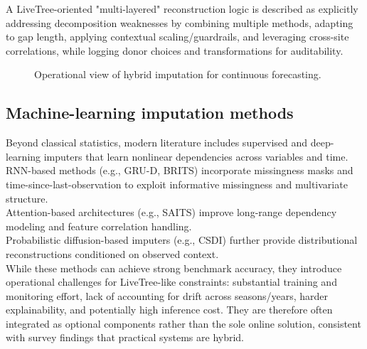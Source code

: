 A LiveTree-oriented "multi-layered" reconstruction logic is described as explicitly addressing decomposition weaknesses by combining multiple methods, adapting to gap length, applying contextual scaling/guardrails, and leveraging cross-site correlations, while logging donor choices and transformations for auditability.%
%

\begin{figure}[h]
\centering
{}
\caption{Operational view of hybrid imputation for continuous forecasting.}
\end{figure}

\subsection{Machine-learning imputation methods}
Beyond classical statistics, modern literature includes supervised and deep-learning imputers that learn nonlinear dependencies across variables and time. RNN-based methods (e.g., GRU-D, BRITS) incorporate missingness masks and time-since-last-observation to exploit informative missingness and multivariate structure.\\%
Attention-based architectures (e.g., SAITS) improve long-range dependency modeling and feature correlation handling.\\%
Probabilistic diffusion-based imputers (e.g., CSDI) further provide distributional reconstructions conditioned on observed context.\\%

While these methods can achieve strong benchmark accuracy, they introduce operational challenges for LiveTree-like constraints: substantial training and monitoring effort, lack of accounting for drift across seasons/years, harder explainability, and potentially high inference cost. They are therefore often integrated as optional components rather than the sole online solution, consistent with survey findings that practical systems are hybrid.%
% 

